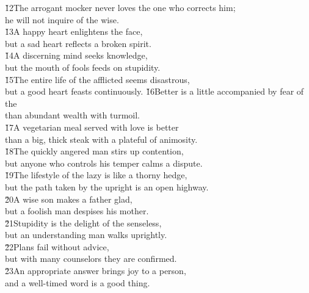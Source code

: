 \begin{poetry}
\poeml \v{12}The arrogant mocker never loves the one who corrects him; \\
\poemll    he will not inquire of the wise. \\
\poeml \v{13}A happy heart enlightens the face, \\
\poemll    but a sad heart reflects a broken spirit. \\
\poeml \v{14}A discerning mind seeks knowledge, \\
\poemll    but the mouth of fools feeds on stupidity. \\
\poeml \v{15}The entire life of the afflicted seems disastrous, \\
\poemll    but a good heart feasts continuously.
\poeml \v{16}Better is a little accompanied by fear of the  \\
\poemll    than abundant wealth with turmoil. \\
\poeml \v{17}A vegetarian meal served with love is better \\
\poemll    than a big, thick steak with a plateful of animosity. \\
\poeml \v{18}The quickly angered man stirs up contention, \\
\poemll    but anyone who controls his temper calms a dispute. \\
\poeml \v{19}The lifestyle of the lazy is like a thorny hedge, \\
\poemll    but the path taken by the upright is an open highway. \\
\poeml \v{20}A wise son makes a father glad, \\
\poemll    but a foolish man despises his mother. \\
\poeml \v{21}Stupidity is the delight of the senseless, \\
\poemll    but an understanding man walks uprightly. \\
\poeml \v{22}Plans fail without advice, \\
\poemll    but with many counselors they are confirmed. \\
\poeml \v{23}An appropriate answer brings joy to a person, \\
\poemll    and a well-timed word is a good thing. \\

\end{poetry}

